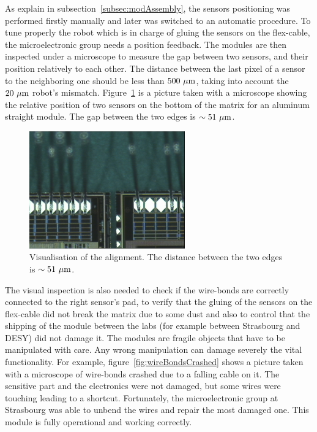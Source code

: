   As explain in subsection~\ref{subsec:modAssembly}, the sensors positioning was performed firstly manually and later was switched to an automatic procedure.
  To tune properly the robot which is in charge of gluing the sensors on the flex-cable, the microelectronic group needs a position feedback.
  The modules are then inspected under a microscope to measure the gap between two sensors, and their position relatively to each other.
  The distance between the last pixel of a sensor to the neighboring one should be less than $500~\mu\rm{m}$, taking into account the $20~\mu\rm{m}$ robot's mismatch.
  Figure~\ref{fig:visAlign} is a picture taken with a microscope showing the relative position of two sensors on the bottom of the matrix for an aluminum straight module.
  The gap between the two edges is $\sim 51~\mu\rm{m}$. 
  
  \begin{figure}
    \centering
    \includegraphics[width=0.6\textwidth]{Pictures/labTests/alignment_sensors.jpg}
    \caption{Visualisation of the alignment. The distance between the two edges is $\sim 51~\mu\rm{m}$.}
    \label{fig:visAlign}
  \end{figure}
  
  The visual inspection is also needed to check if the wire-bonds are correctly connected to the right sensor's pad, to verify that the gluing of the sensors on the flex-cable did not break the matrix due to some dust and also to control that the shipping of the module between the labs (for example between Strasbourg and DESY) did not damage it.
  The modules are fragile objects that have to be manipulated with care.
  Any wrong manipulation can damage severely the vital functionality.
  For example, figure~\ref{fig:wireBondsCrashed} shows a picture taken with a microscope of wire-bonds crashed due to a falling cable on it.
  The sensitive part and the electronics were not damaged, but some wires were touching leading to a shortcut.
  Fortunately, the microelectronic group at Strasbourg was able to unbend the wires and repair the most damaged one.
  This module is fully operational and working correctly.

